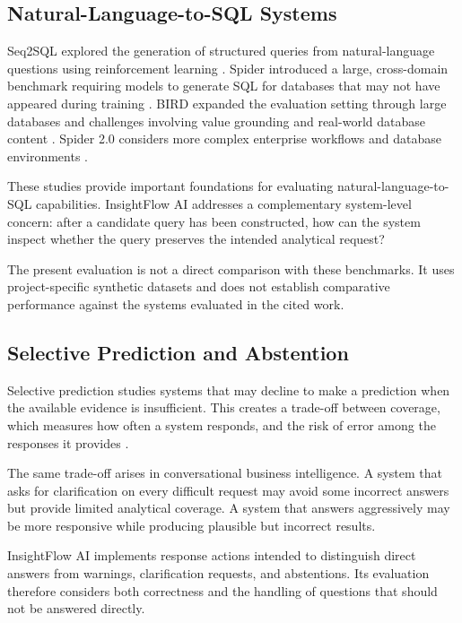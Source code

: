 \documentclass[conference]{IEEEtran}
\begin{document}
\subsection{Natural-Language-to-SQL Systems}

Seq2SQL explored the generation of structured queries from natural-language questions using reinforcement learning \cite{zhong2017seq2sql}. Spider introduced a large, cross-domain benchmark requiring models to generate SQL for databases that may not have appeared during training \cite{yu2018spider}. BIRD expanded the evaluation setting through large databases and challenges involving value grounding and real-world database content \cite{li2023bird}. Spider 2.0 considers more complex enterprise workflows and database environments \cite{lei2025spider2}.

These studies provide important foundations for evaluating natural-language-to-SQL capabilities. InsightFlow AI addresses a complementary system-level concern: after a candidate query has been constructed, how can the system inspect whether the query preserves the intended analytical request?

The present evaluation is not a direct comparison with these benchmarks. It uses project-specific synthetic datasets and does not establish comparative performance against the systems evaluated in the cited work.

\subsection{Selective Prediction and Abstention}

Selective prediction studies systems that may decline to make a prediction when the available evidence is insufficient. This creates a trade-off between coverage, which measures how often a system responds, and the risk of error among the responses it provides \cite{geifman2017selective}.

The same trade-off arises in conversational business intelligence. A system that asks for clarification on every difficult request may avoid some incorrect answers but provide limited analytical coverage. A system that answers aggressively may be more responsive while producing plausible but incorrect results.

InsightFlow AI implements response actions intended to distinguish direct answers from warnings, clarification requests, and abstentions. Its evaluation therefore considers both correctness and the handling of questions that should not be answered directly.
\end{document}
